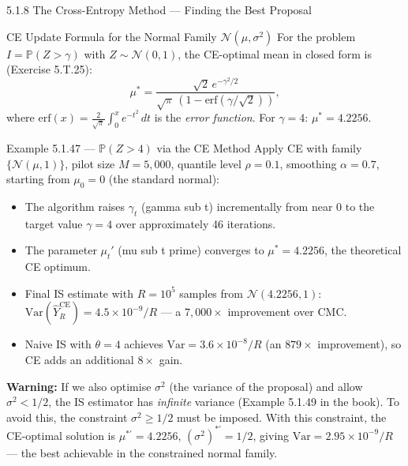 \documentclass[aspectratio=169,10pt]{beamer}
\begin{document}
\begin{frame}[allowframebreaks]{5.1.8 The Cross-Entropy Method --- Finding the Best Proposal}
\begin{block}{CE Update Formula for the Normal Family $\mathcal{N}(\mu, \sigma^2)$}
  For the problem $I = \mathbb{P}(Z > \gamma)$ with $Z \sim \mathcal{N}(0,1)$,
  the CE-optimal mean in closed form is (Exercise 5.T.25):
  \[
    \mu^* = \frac{\sqrt{2}\,e^{-\gamma^2/2}}{\sqrt{\pi}\,(1-\mathrm{erf}(\gamma/\sqrt{2}))},
  \]
  where $\mathrm{erf}(x) = \frac{2}{\sqrt{\pi}}\int_0^x e^{-t^2}\,dt$ is the
  \emph{error function}.  For $\gamma = 4$: $\mu^* = 4.2256$.
\end{block}

\framebreak

\begin{exampleblock}{Example 5.1.47 --- $\mathbb{P}(Z > 4)$ via the CE Method}
  Apply CE with family $\{\mathcal{N}(\mu,1)\}$, pilot size $M = 5{,}000$,
  quantile level $\rho = 0.1$, smoothing $\alpha = 0.7$,
  starting from $\mu_0 = 0$ (the standard normal):
  \begin{itemize}
    \item The algorithm raises $\gamma_t$ (gamma sub t) incrementally from
          near 0 to the target value $\gamma = 4$ over approximately 46 iterations.
    \item The parameter $\mu_t'$ (mu sub t prime) converges to
          $\mu^* = 4.2256$, the theoretical CE optimum.
    \item Final IS estimate with $R = 10^5$ samples from $\mathcal{N}(4.2256, 1)$:
          $\mathrm{Var}(\hat{Y}_R^{\mathrm{CE}}) = 4.5\times10^{-9}/R$ ---
          a $7{,}000\times$ improvement over CMC.
    \item Naive IS with $\theta = 4$ achieves $\mathrm{Var} = 3.6\times10^{-8}/R$
          (an $879\times$ improvement), so CE adds an additional $8\times$ gain.
  \end{itemize}

  \medskip
  \textbf{Warning:} If we also optimise $\sigma^2$ (the variance of the proposal)
  and allow $\sigma^2 < 1/2$, the IS estimator has \emph{infinite} variance
  (Example 5.1.49 in the book).  To avoid this, the constraint $\sigma^2 \ge 1/2$
  must be imposed.  With this constraint, the CE-optimal solution is
  $\mu^{*'} = 4.2256$, $(\sigma^2)^{*'} = 1/2$, giving
  $\mathrm{Var} = 2.95\times10^{-9}/R$ --- the best achievable in the constrained
  normal family.
\end{exampleblock}

\end{frame}
\end{document}
